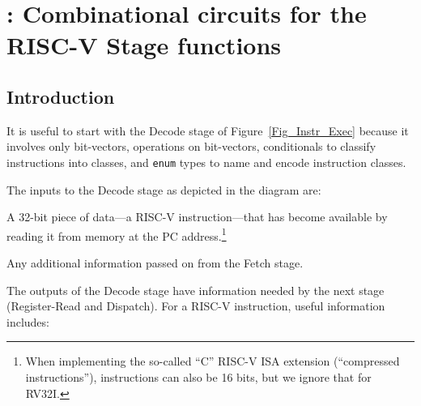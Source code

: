 

\chapter{{\BSV}: Combinational circuits for the RISC-V Stage functions}


\setcounter{page}{1}
\renewcommand{\thepage}{\arabic{chapter}-\arabic{page}}

\label{ch_Combo_Circuits}


\section{Introduction}

It is useful to start with the Decode stage of
Figure~\ref{Fig_Instr_Exec} because it involves only bit-vectors,
operations on bit-vectors, conditionals to classify instructions into
classes, and \verb|enum| types to name and encode instruction classes.

The inputs to the Decode stage as depicted in the diagram are:

\begin{tightlist}

 \item A 32-bit piece of data---a RISC-V instruction---that has become
 available by reading it from memory at the PC address.\footnote{When
 implementing the so-called ``C'' RISC-V ISA extension (``compressed
 instructions''), instructions can also be 16 bits, but we ignore that
 for RV32I.}

 \item Any additional information passed on from the Fetch stage.

\end{tightlist}

The outputs of the Decode stage have information needed by the next
stage (Register-Read and Dispatch).  For a RISC-V instruction, useful
information includes:

